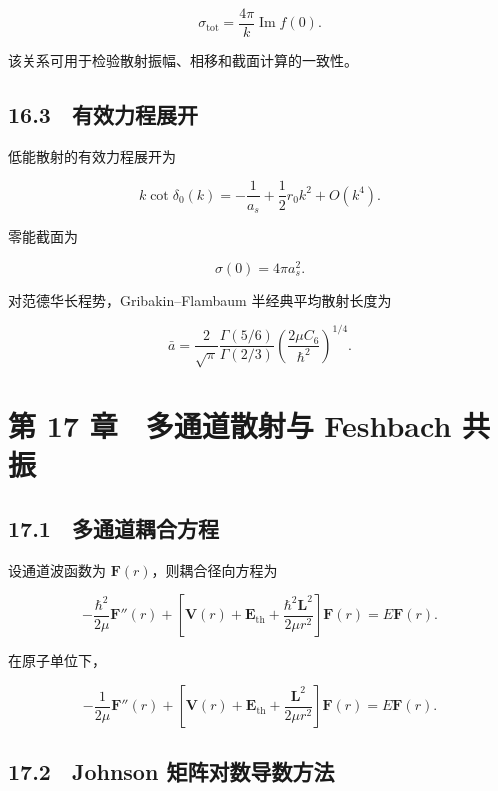 \documentclass[
  a4paper,
]{ctexbook}
\begin{document}
\[
\sigma_{\mathrm{tot}}
=
\frac{4\pi}{k}
\operatorname{Im}f(0).
\]

该关系可用于检验散射振幅、相移和截面计算的一致性。

\hypertarget{ux6709ux6548ux529bux7a0bux5c55ux5f00}{%
\subsection{16.3　有效力程展开}\label{ux6709ux6548ux529bux7a0bux5c55ux5f00}}

低能散射的有效力程展开为

\[
k\cot\delta_0(k)
=
-\frac{1}{a_s}
+
\frac12r_0k^2
+
O(k^4).
\]

零能截面为

\[
\sigma(0)=4\pi a_s^2.
\]

对范德华长程势，Gribakin--Flambaum 半经典平均散射长度为

\[
\bar a
=
\frac{2}{\sqrt\pi}
\frac{
\Gamma(5/6)
}{
\Gamma(2/3)
}
\left(
\frac{2\mu C_6}{\hbar^2}
\right)^{1/4}.
\]

\hypertarget{ux7b2c-17-ux7ae0-ux591aux901aux9053ux6563ux5c04ux4e0e-feshbach-ux5171ux632f}{%
\section{第 17 章　多通道散射与 Feshbach
共振}\label{ux7b2c-17-ux7ae0-ux591aux901aux9053ux6563ux5c04ux4e0e-feshbach-ux5171ux632f}}

\hypertarget{ux591aux901aux9053ux8026ux5408ux65b9ux7a0b}{%
\subsection{17.1　多通道耦合方程}\label{ux591aux901aux9053ux8026ux5408ux65b9ux7a0b}}

设通道波函数为 \(\mathbf F(r)\)，则耦合径向方程为

\[
-\frac{\hbar^2}{2\mu}
\mathbf F''(r)
+
\left[
\mathbf V(r)
+
\mathbf E_{\mathrm{th}}
+
\frac{\hbar^2\mathbf L^2}{2\mu r^2}
\right]
\mathbf F(r)
=
E\mathbf F(r).
\]

在原子单位下，

\[
-\frac{1}{2\mu}
\mathbf F''(r)
+
\left[
\mathbf V(r)
+
\mathbf E_{\mathrm{th}}
+
\frac{\mathbf L^2}{2\mu r^2}
\right]
\mathbf F(r)
=
E\mathbf F(r).
\]

\hypertarget{johnson-ux77e9ux9635ux5bf9ux6570ux5bfcux6570ux65b9ux6cd5}{%
\subsection{17.2　Johnson
矩阵对数导数方法}\label{johnson-ux77e9ux9635ux5bf9ux6570ux5bfcux6570ux65b9ux6cd5}}
\end{document}
